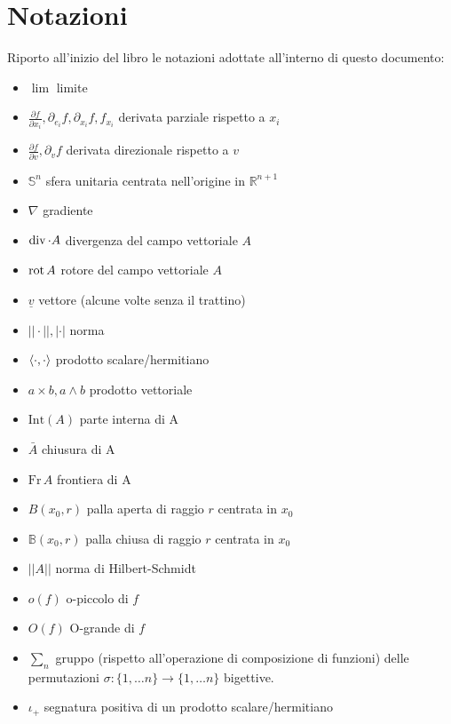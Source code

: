 \documentclass[12pt, twoside, italian]{book}
\begin{document}
	\chapter*{Notazioni}
	\pagestyle{empty}
	\thispagestyle{empty}
	\pagestyle{fancy}

	Riporto all'inizio del libro le notazioni adottate all'interno di questo documento:
	\begin{itemize}[label=\hspace{-0.5em}]
		\item $\lim$ limite		
		\item $\frac{\partial f}{\partial x_i}, \partial_{e_i} f, \partial_{x_i} f, f_{x_i}$ derivata parziale rispetto a $x_i$
		\item $\frac{\partial f}{\partial v}, \partial_v f$ derivata direzionale rispetto a $v$
		\item $\mathbb{S}^{n}$ sfera unitaria centrata nell'origine in $\mathbb{R}^{n+1}$
		\item $\nabla$ gradiente
		\item $\operatorname{div} \cdot A$ divergenza del campo vettoriale $A$
		\item $\operatorname{rot} A$ rotore del campo vettoriale $A$
		\item $\underline{v}$ vettore (alcune volte senza il trattino)
		\item $||\cdot||, |\cdot|$ norma
		\item $\langle \cdot, \cdot \rangle$ prodotto scalare/hermitiano
		\item $a \times b, a \wedge b$ prodotto vettoriale
		\item $\text{Int}(A)$ parte interna di A
		\item $\bar{A}$ chiusura di A
		\item $\text{Fr} \, A$ frontiera di A
		\item $B(x_0, r)$ palla aperta di raggio $r$ centrata in $x_0$
		\item $\mathbb{B}(x_0, r)$ palla chiusa di raggio $r$ centrata in $x_0$
		\item $|| A ||$ norma di Hilbert-Schmidt
		\item $o(f)$ o-piccolo di $f$
		\item $O(f)$ O-grande di $f$
		\item $\sum_{n}$ gruppo (rispetto all'operazione di composizione di funzioni) delle permutazioni $\sigma: \{1, \ldots n \} \to \{1, \ldots n \}$ bigettive.
		\item $\iota_+$ segnatura positiva di un prodotto scalare/hermitiano

\end{itemize}
\end{document}
